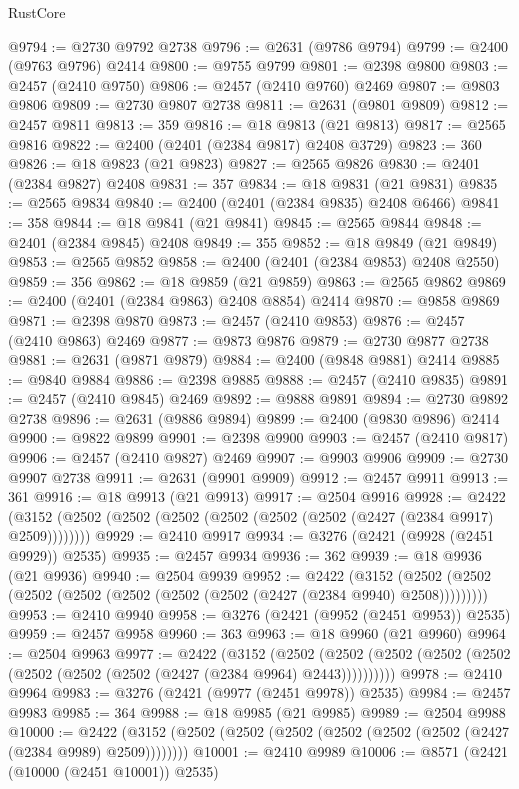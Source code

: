 \begin{lexlean}{RustCore}
\begin{coremodule}
@9794 := @2730 @9792 @2738
@9796 := @2631 (@9786 @9794)
@9799 := @2400 (@9763 @9796) @2414
@9800 := @9755 @9799
@9801 := @2398 @9800
@9803 := @2457 (@2410 @9750)
@9806 := @2457 (@2410 @9760) @2469
@9807 := @9803 @9806
@9809 := @2730 @9807 @2738
@9811 := @2631 (@9801 @9809)
@9812 := @2457 @9811
@9813 := 359
@9816 := @18 @9813 (@21 @9813)
@9817 := @2565 @9816
@9822 := @2400 (@2401 (@2384 @9817) @2408 @3729)
@9823 := 360
@9826 := @18 @9823 (@21 @9823)
@9827 := @2565 @9826
@9830 := @2401 (@2384 @9827) @2408
@9831 := 357
@9834 := @18 @9831 (@21 @9831)
@9835 := @2565 @9834
@9840 := @2400 (@2401 (@2384 @9835) @2408 @6466)
@9841 := 358
@9844 := @18 @9841 (@21 @9841)
@9845 := @2565 @9844
@9848 := @2401 (@2384 @9845) @2408
@9849 := 355
@9852 := @18 @9849 (@21 @9849)
@9853 := @2565 @9852
@9858 := @2400 (@2401 (@2384 @9853) @2408 @2550)
@9859 := 356
@9862 := @18 @9859 (@21 @9859)
@9863 := @2565 @9862
@9869 := @2400 (@2401 (@2384 @9863) @2408 @8854) @2414
@9870 := @9858 @9869
@9871 := @2398 @9870
@9873 := @2457 (@2410 @9853)
@9876 := @2457 (@2410 @9863) @2469
@9877 := @9873 @9876
@9879 := @2730 @9877 @2738
@9881 := @2631 (@9871 @9879)
@9884 := @2400 (@9848 @9881) @2414
@9885 := @9840 @9884
@9886 := @2398 @9885
@9888 := @2457 (@2410 @9835)
@9891 := @2457 (@2410 @9845) @2469
@9892 := @9888 @9891
@9894 := @2730 @9892 @2738
@9896 := @2631 (@9886 @9894)
@9899 := @2400 (@9830 @9896) @2414
@9900 := @9822 @9899
@9901 := @2398 @9900
@9903 := @2457 (@2410 @9817)
@9906 := @2457 (@2410 @9827) @2469
@9907 := @9903 @9906
@9909 := @2730 @9907 @2738
@9911 := @2631 (@9901 @9909)
@9912 := @2457 @9911
@9913 := 361
@9916 := @18 @9913 (@21 @9913)
@9917 := @2504 @9916
@9928 := @2422 (@3152 (@2502 (@2502 (@2502 (@2502 (@2502 (@2502 (@2427 (@2384 @9917) @2509))))))))
@9929 := @2410 @9917
@9934 := @3276 (@2421 (@9928 (@2451 @9929)) @2535)
@9935 := @2457 @9934
@9936 := 362
@9939 := @18 @9936 (@21 @9936)
@9940 := @2504 @9939
@9952 := @2422
    (@3152 (@2502 (@2502 (@2502 (@2502 (@2502 (@2502 (@2502 (@2427 (@2384 @9940) @2508)))))))))
@9953 := @2410 @9940
@9958 := @3276 (@2421 (@9952 (@2451 @9953)) @2535)
@9959 := @2457 @9958
@9960 := 363
@9963 := @18 @9960 (@21 @9960)
@9964 := @2504 @9963
@9977 := @2422
    (@3152
      (@2502 (@2502 (@2502 (@2502 (@2502 (@2502 (@2502 (@2502 (@2427 (@2384 @9964) @2443))))))))))
@9978 := @2410 @9964
@9983 := @3276 (@2421 (@9977 (@2451 @9978)) @2535)
@9984 := @2457 @9983
@9985 := 364
@9988 := @18 @9985 (@21 @9985)
@9989 := @2504 @9988
@10000 := @2422 (@3152 (@2502 (@2502 (@2502 (@2502 (@2502 (@2502 (@2427 (@2384 @9989) @2509))))))))
@10001 := @2410 @9989
@10006 := @8571 (@2421 (@10000 (@2451 @10001)) @2535)

\end{coremodule}
\end{lexlean}
